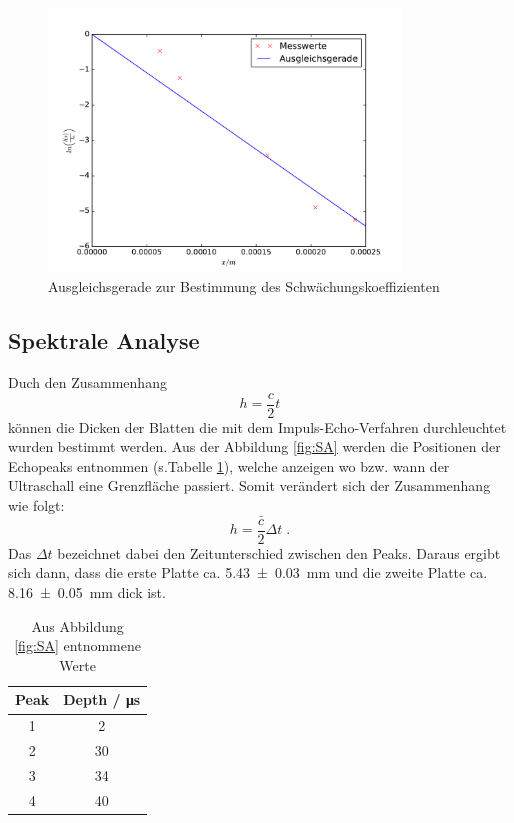 \begin{figure}
  \centering
  \includegraphics[height = 7cm]{plots/alphaplot.pdf}
  \caption{Ausgleichsgerade zur Bestimmung des Schwächungskoeffizienten}
  \label{fig:alpha}
\end{figure}

\FloatBarrier
\subsection{Spektrale Analyse}
Duch den Zusammenhang
\begin{equation*}
h = \frac{c}{2} t
\end{equation*}
können die Dicken der Blatten die mit dem Impuls-Echo-Verfahren durchleuchtet
wurden bestimmt werden. Aus der Abbildung \ref{fig:SA} werden die Positionen
der Echopeaks entnommen (s.Tabelle \ref{tab:SAW}), welche anzeigen wo bzw. wann der Ultraschall eine
Grenzfläche passiert. Somit verändert sich der Zusammenhang wie folgt:
\begin{equation*}
  h = \frac{\bar{c}}{2} \Delta t \; .
\end{equation*}
Das $\Delta t $ bezeichnet dabei den Zeitunterschied zwischen den Peaks.
Daraus ergibt sich dann, dass die erste Platte ca. \SI{5.43(3)}{\milli\meter}
und die zweite Platte ca. \SI{8.16(5)}{\milli\meter} dick ist.
\begin{table}
  \centering
  \caption{Aus Abbildung \ref{fig:SA} entnommene Werte}
  \begin{tabular}{c c}
    \toprule
    Peak & Depth  / \si{\micro\second}\\
    \midrule
    1 & 2 \\
    2 & 30 \\
    3 & 34 \\
    4 & 40 \\
    \bottomrule
  \end{tabular}
\label{tab:SAW}
\end{table}


